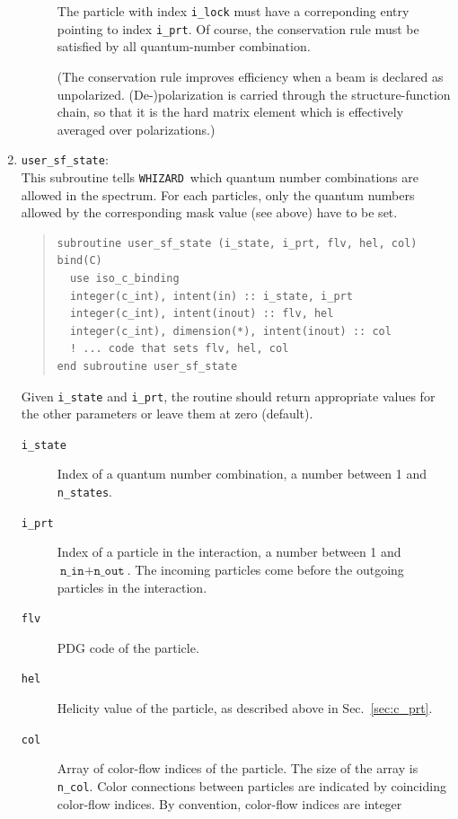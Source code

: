 \documentclass[12pt]{book}
\newcommand{\ttt}[1]{\texttt{#1}}
\newcommand{\whizard}{\texttt{WHIZARD}}
\begin{document}
\begin{enumerate}
\begin{description}
    The particle with index \ttt{i\_lock} must have a correponding
    entry pointing to index \ttt{i\_prt}.  Of course, the conservation
    rule must be satisfied by all quantum-number combination.

    (The conservation rule improves efficiency when a beam is declared as
    unpolarized.  (De-)polarization is carried through the
    structure-function chain, so that it is the hard matrix element
    which is effectively averaged over polarizations.)
  \end{description}
\item
  \ttt{user\_sf\_state}:\\
  This subroutine tells \whizard\ which quantum number combinations
  are allowed in the spectrum.  For each particles, only the quantum
  numbers allowed by the corresponding mask value (see above) have to
  be set.
  \begin{quote}
  \begin{footnotesize}
\begin{verbatim}
subroutine user_sf_state (i_state, i_prt, flv, hel, col) bind(C)
  use iso_c_binding
  integer(c_int), intent(in) :: i_state, i_prt
  integer(c_int), intent(inout) :: flv, hel
  integer(c_int), dimension(*), intent(inout) :: col
  ! ... code that sets flv, hel, col
end subroutine user_sf_state
\end{verbatim}
  \end{footnotesize}
  \end{quote}
  Given \ttt{i\_state} and \ttt{i\_prt}, the routine should return
  appropriate values for the other parameters or leave them at zero
  (default).
  \begin{description}
  \item[\ttt{i\_state}]  Index of a quantum number combination, a
    number between 1 and \ttt{n\_states}.
  \item[\ttt{i\_prt}]  Index of a particle in the interaction, a
    number between 1 and $\ttt{n\_in}+\ttt{n\_out}$.  The incoming
    particles come before the outgoing particles in the interaction.
  \item[\ttt{flv}]  PDG code of the particle.
  \item[\ttt{hel}]  Helicity value of the particle, as described above
    in Sec.~\ref{sec:c_prt}.
  \item[\ttt{col}]  Array of color-flow indices of the particle.  The
    size of the array is \ttt{n\_col}.  Color
    connections between particles are indicated by coinciding
    color-flow indices.  By convention, color-flow indices are integer

\end{description}
\end{enumerate}
\end{document}
